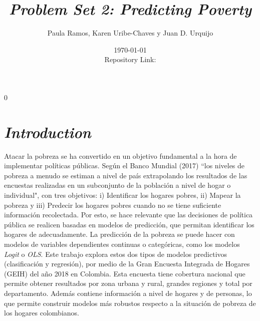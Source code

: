 \documentclass[11pt]{article}
\newcommand{\blind}{0}
\renewcommand{\baselinestretch}{0.8}
\begin{document}
		
		\def\spacingset#1{\renewcommand{\baselinestretch}%
			{#1}\small\normalsize} \spacingset{0.8}
		
		\blind
		{
			\title{\bf \emph{Problem Set 2: Predicting Poverty}}
\author{Paula Ramos, Karen Uribe-Chaves y Juan D. Urquijo} 
\date{\today \\ Repository Link:\href{https://github.com/KarenUC/ProblemSet2_Ramos_Uribe_Urquijo} {\color{blue}{\it Github}}}
			}

   		\maketitle
   		\spacingset{0.85}	

\section{\bf \emph {Introduction}} \label{sec:intro}

\justify
Atacar la pobreza se ha convertido en un objetivo fundamental a la hora de implementar políticas públicas. Según el Banco Mundial (2017) ``los niveles de pobreza a menudo se estiman a nivel de país extrapolando los resultados de las encuestas realizadas en un subconjunto de la población a nivel de hogar o individual", con tres objetivos: i) Identificar los hogares pobres, ii) Mapear la pobreza y iii) Predecir los hogares pobres cuando no se tiene suficiente información recolectada.  Por esto, se hace relevante que las decisiones de política pública se realicen basadas en modelos de predicción, que permitan identificar los hogares de adecuadamente.
\justify
La predicción de la pobreza se puede hacer con modelos de variables dependientes continuas o categóricas, como los modelos \emph{Logit} o \emph{OLS}. Este trabajo explora estos dos tipos de modelos predictivos (clasificación y regresión), por medio de la Gran Encuesta Integrada de Hogares (GEIH) del año 2018 en Colombia. Esta encuesta  tiene cobertura nacional que permite obtener resultados por zona urbana y rural, grandes regiones y total por departamento. Además contiene información a nivel de hogares y de personas, lo que permite construir modelos más robustos respecto a la situación de pobreza de los hogares colombianos.
\end{document}
